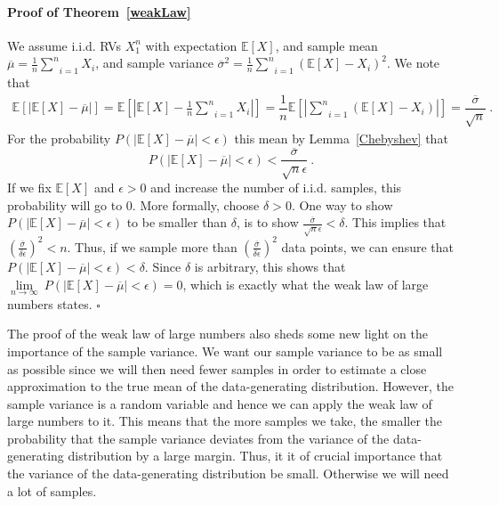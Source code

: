 \paragraph{Proof of Theorem~\ref{weakLaw}} We assume i.i.d. RVs $ X_{1}^{n} $ with expectation $ \mathbb{E}[X] $, and sample mean 
$ \overline{\mu} = \frac{1}{n} \underset{i=1}{\overset{n}{\sum}} X_{i} $, and sample variance 
$ \overline{\sigma}^{2} = \frac{1}{n} \underset{i=1}{\overset{n}{\sum}} \left(\mathbb{E}[X] - X_{i}\right)^{2} $. We note that 
\begin{align}
\mathbb{E}\left[|\mathbb{E}[X] - \overline{\mu}|\right] = \mathbb{E} \left[|\mathbb{E}[X] - \frac{1}{n} \underset{i=1}{\overset{n}{\sum}} X_{i}|\right]
= \dfrac{1}{n} \mathbb{E} \left[|\underset{i=1}{\overset{n}{\sum}}(\mathbb{E}[X] -  X_{i})| \right]
= \dfrac{\overline{\sigma}}{\sqrt{n}} \ .
\end{align}
For the probability $ P(|\mathbb{E}[X] - \overline{\mu}| < \epsilon) $ this mean by Lemma~\ref{Chebyshev} that
\begin{equation}
P(|\mathbb{E}[X] - \overline{\mu}| < \epsilon) < \dfrac{\overline{\sigma}}{\sqrt{n}\epsilon} \ .
\end{equation}
If we fix $ \mathbb{E}[X] $ and $ \epsilon > 0 $ and increase the number of i.i.d. samples, this probability will go to 0.
More formally, choose $ \delta > 0 $. One way to show $ P(|\mathbb{E}[X] - \overline{\mu}| < \epsilon) $ to be smaller than $ \delta $, is to show 
$ \frac{\overline{\sigma}}{\sqrt{n}\epsilon} < \delta $. This implies that $ \left( \frac{\overline{\sigma}}{\delta\epsilon} \right)^{2} < n $. Thus, if we sample
more than $  \left( \frac{\overline{\sigma}}{\delta\epsilon} \right)^{2} $ data points, we can ensure that $ P(|\mathbb{E}[X] - \overline{\mu}| < \epsilon) < \delta $.
Since $ \delta $ is arbitrary, this shows that $ \underset{n \rightarrow \infty}{\lim}~P(|\mathbb{E}[X] - \overline{\mu}| < \epsilon) = 0 $, 
which is exactly what the weak law of large numbers states. $ \square $ \bigskip

The proof of the weak law of large numbers also sheds some new light on the importance of the sample variance. We want our sample variance to be as small as possible
since we will then need fewer samples in order to estimate a close approximation to the true mean of the data-generating distribution. However, the sample variance
is a random variable and hence we can apply the weak law of large numbers to it. This means that the more samples we take, the smaller the probability that the
sample variance deviates from the variance of the data-generating distribution by a large margin. Thus, it it of crucial importance that the variance of the 
data-generating distribution be small. Otherwise we will need a lot of samples.

